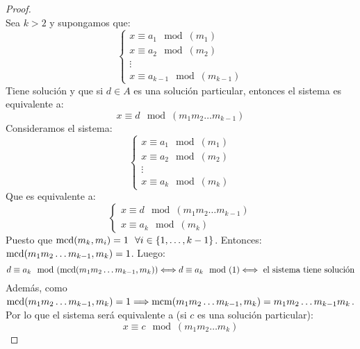 \begin{lema}
\begin{proof}
    \ \\
    
    Sea $k>2$ y supongamos que:
    $$\left\{ \begin{array}{l}
            x\equiv a_1\mod(m_1) \\
            x\equiv a_2\mod(m_2) \\
            \vdots               \\
            x\equiv a_{k-1}\mod(m_{k-1})
        \end{array} \right.$$
    Tiene solución y que si $d\in A$ es una solución particular, entonces el sistema es equivalente a:
    $$x\equiv d\mod(m_1m_2\ldots m_{k-1})$$
    Consideramos el sistema:
    $$\left\{ \begin{array}{l}
            x\equiv a_1\mod(m_1) \\
            x\equiv a_2\mod(m_2) \\
            \vdots               \\
            x\equiv a_k\mod(m_k)
        \end{array} \right.$$
    Que es equivalente a:
    $$\left\{ \begin{array}{l}
            x\equiv d\mod(m_1m_2\ldots m_{k-1}) \\
            x\equiv a_k\mod(m_k)
        \end{array} \right.$$
    Puesto que $\operatorname{mcd}(m_k, m_i) = 1 ~~\forall i \in \{1, \ldots, k-1\}$.
    \newline Entonces: $\operatorname{mcd}(m_1m_2\ldots m_{k-1},m_k)=1$. Luego:
    $$d\equiv a_k\mod(\operatorname{mcd}(m_1m_2\ldots m_{k-1},m_k)) \Longleftrightarrow d\equiv a_k\mod(1) \Longleftrightarrow \mbox{ el sistema tiene solución}$$
    Además, como $\operatorname{mcd}(m_1m_2\ldots m_{k-1},m_k) = 1 \Longrightarrow \operatorname{mcm}(m_1m_2\ldots m_{k-1},m_k)=m_1m_2\ldots m_{k-1}m_k$.\\

    
    Por lo que el sistema será equivalente a (si $c$ es una solución particular):
    $$x\equiv c\mod(m_1m_2\ldots m_k)$$
\end{proof}
\end{lema}

